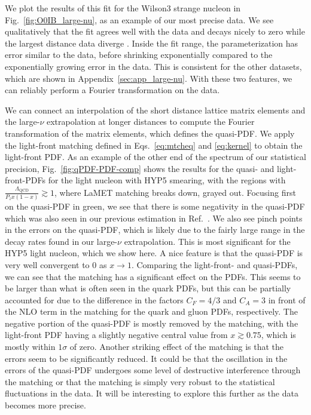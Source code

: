 We plot the results of this fit for the Wilson3 strange nucleon in Fig.~\ref{fig:O0IB_large-nu}, as an example of our most precise data.
We see qualitatively that the fit agrees well with the data and decays nicely to zero while the largest distance data diverge .
Inside the fit range, the parameterization has error similar to the data, before shrinking exponentially compared to the exponentially growing error in the data.
This is consistent for the other datasets, which are shown in Appendix~\ref{sec:app_large-nu}.
With these two features, we can reliably perform a Fourier transformation on the data.

We can connect an interpolation of the short distance lattice matrix elements and the large-$\nu$ extrapolation at longer distances to compute the Fourier transformation of the matrix elements, which defines the quasi-PDF.
We apply the light-front matching defined in Eqs.~\ref{eq:mtcheq} and \ref{eq:kernel} to obtain the light-front PDF.
As an example of the other end of the spectrum of our statistical precision, Fig.~\ref{fig:qPDF-PDF-comp} shows the results for the quasi- and light-front-PDFs for the light nucleon with HYP5 smearing, with the regions with $\frac{\Lambda_\text{QCD}}{P_zx(1-x)} \gtrsim 1$, where LaMET matching breaks down, grayed out.
Focusing first on the quasi-PDF in green, we see that there is some negativity in the quasi-PDF which was also seen in our previous estimation in Ref.~\cite{Good:2024iur}.
We also see pinch points in the errors on the quasi-PDF, which is likely due to the fairly large range in the decay rates found in our large-$\nu$ extrapolation.
This is most significant for the HYP5 light nucleon, which we show here.
A nice feature is that the quasi-PDF is very well convergent to 0 as $x \rightarrow 1$.
Comparing the light-front- and quasi-PDFs, we can see that the matching has a significant effect on the PDFs.
This seems to be larger than what is often seen in the quark PDFs, but this can be partially accounted for due to the difference in the factors $C_F = 4/3$ and $C_A = 3$ in front of the NLO term in the matching for the quark and gluon PDFs, respectively.
The negative portion of the quasi-PDF is mostly removed by the matching, with the light-front PDF having a slightly negative central value from $x \gtrsim 0.75$, which is mostly within $1\sigma$ of zero.
Another striking effect of the matching is that the errors seem to be significantly reduced.
It could be that the oscillation in the errors of the quasi-PDF undergoes some level of destructive interference through the matching or that the matching is simply very robust to the statistical fluctuations in the data.
It will be interesting to explore this further as the data becomes more precise.

